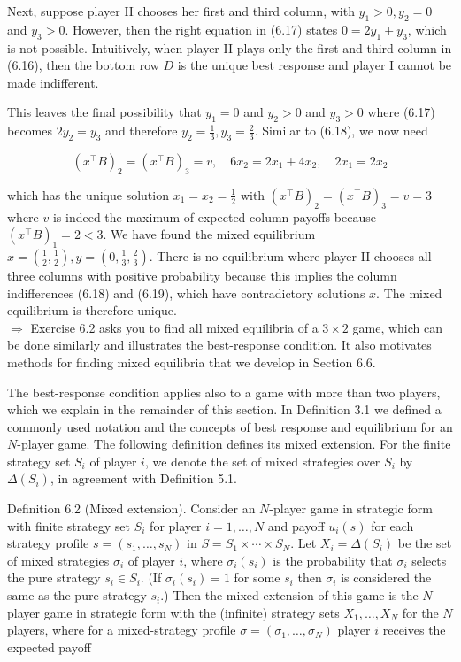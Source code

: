 \documentclass[12pt]{article}
\begin{document}
Next, suppose player II chooses her first and third column, with $y_{1}>0, y_{2}=0$ and $y_{3}>0$. However, then the right equation in (6.17) states $0=2 y_{1}+y_{3}$, which is not possible. Intuitively, when player II plays only the first and third column in (6.16), then the bottom row $D$ is the unique best response and player I cannot be made indifferent.

This leaves the final possibility that $y_{1}=0$ and $y_{2}>0$ and $y_{3}>0$ where (6.17) becomes $2 y_{2}=y_{3}$ and therefore $y_{2}=\frac{1}{3}, y_{3}=\frac{2}{3}$. Similar to (6.18), we now need


\begin{equation*}
\left(x^{\top} B\right)_{2}=\left(x^{\top} B\right)_{3}=v, \quad 6 x_{2}=2 x_{1}+4 x_{2}, \quad 2 x_{1}=2 x_{2} \tag{6.19}
\end{equation*}


which has the unique solution $x_{1}=x_{2}=\frac{1}{2}$ with $\left(x^{\top} B\right)_{2}=\left(x^{\top} B\right)_{3}=v=3$ where $v$ is indeed the maximum of expected column payoffs because $\left(x^{\top} B\right)_{1}=2<3$. We have found the mixed equilibrium $x=\left(\frac{1}{2}, \frac{1}{2}\right), y=\left(0, \frac{1}{3}, \frac{2}{3}\right)$. There is no equilibrium where player II chooses all three columns with positive probability because this implies the column indifferences (6.18) and (6.19), which have contradictory solutions $x$. The mixed equilibrium is therefore unique.\\
$\Rightarrow$ Exercise 6.2 asks you to find all mixed equilibria of a $3 \times 2$ game, which can be done similarly and illustrates the best-response condition. It also motivates methods for finding mixed equilibria that we develop in Section 6.6.

The best-response condition applies also to a game with more than two players, which we explain in the remainder of this section. In Definition 3.1 we defined a commonly used notation and the concepts of best response and equilibrium for an $N$-player game. The following definition defines its mixed extension. For the finite strategy set $S_{i}$ of player $i$, we denote the set of mixed strategies over $S_{i}$ by $\Delta\left(S_{i}\right)$, in agreement with Definition 5.1.

Definition 6.2 (Mixed extension). Consider an $N$-player game in strategic form with finite strategy set $S_{i}$ for player $i=1, \ldots, N$ and payoff $u_{i}(s)$ for each strategy profile $s=\left(s_{1}, \ldots, s_{N}\right)$ in $S=S_{1} \times \cdots \times S_{N}$. Let $X_{i}=\Delta\left(S_{i}\right)$ be the set of mixed strategies $\sigma_{i}$ of player $i$, where $\sigma_{i}\left(s_{i}\right)$ is the probability that $\sigma_{i}$ selects the pure strategy $s_{i} \in S_{i}$. (If $\sigma_{i}\left(s_{i}\right)=1$ for some $s_{i}$ then $\sigma_{i}$ is considered the same as the pure strategy $s_{i}$.) Then the mixed extension of this game is the $N$-player game in strategic form with the (infinite) strategy sets $X_{1}, \ldots, X_{N}$ for the $N$ players, where for a mixed-strategy profile $\sigma=\left(\sigma_{1}, \ldots, \sigma_{N}\right)$ player $i$ receives the expected payoff
\end{document}
